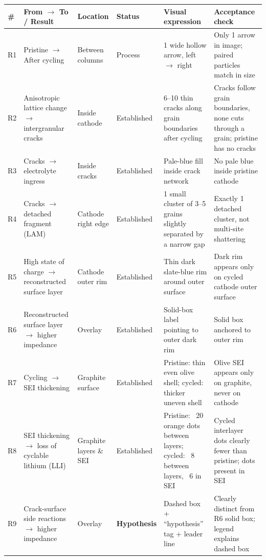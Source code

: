 \begin{center}\scriptsize
\setlength{\tabcolsep}{2.5pt}
\renewcommand{\arraystretch}{1.12}
\begin{tabularx}{\linewidth}{@{}l>{\raggedright\arraybackslash}p{24mm}>{\raggedright\arraybackslash}p{16mm}>{\raggedright\arraybackslash}p{16mm}YY@{}}
\toprule
\textbf{\#} & \textbf{From \ensuremath{\rightarrow} To / Result} & \textbf{Location} & \textbf{Status} & \textbf{Visual expression} & \textbf{Acceptance check} \\
\midrule
R1 & Pristine \ensuremath{\rightarrow} After cycling & Between columns & Process & 1 wide hollow arrow, left \ensuremath{\rightarrow} right & Only 1 arrow in image; paired particles match in size \\
R2 & Anisotropic lattice change \ensuremath{\rightarrow} intergranular cracks & Inside cathode & Established & 6--10 thin cracks along grain boundaries after cycling & Cracks follow grain boundaries, none cuts through a grain; pristine has no cracks \\
R3 & Cracks \ensuremath{\rightarrow} electrolyte ingress & Inside cracks & Established & Pale-blue fill inside crack network & No pale blue inside pristine cathode \\
R4 & Cracks \ensuremath{\rightarrow} detached fragment (LAM) & Cathode right edge & Established & 1 small cluster of 3--5 grains slightly separated by a narrow gap & Exactly 1 detached cluster, not multi-site shattering \\
R5 & High state of charge \ensuremath{\rightarrow} reconstructed surface layer & Cathode outer rim & Established & Thin dark slate-blue rim around outer surface & Dark rim appears only on cycled cathode outer surface \\
R6 & Reconstructed surface layer \ensuremath{\rightarrow} higher impedance & Overlay & Established & Solid-box label pointing to outer dark rim & Solid box anchored to outer rim \\
R7 & Cycling \ensuremath{\rightarrow} SEI thickening & Graphite surface & Established & Pristine: thin even olive shell; cycled: thicker uneven shell & Olive SEI appears only on graphite, never on cathode \\
R8 & SEI thickening \ensuremath{\rightarrow} loss of cyclable lithium (LLI) & Graphite layers \& SEI & Established & Pristine: ~20 orange dots between layers; cycled: ~8 between layers, ~6 in SEI & Cycled interlayer dots clearly fewer than pristine; dots present in SEI \\
R9 & Crack-surface side reactions \ensuremath{\rightarrow} higher impedance & Overlay & \textbf{Hypothesis} & Dashed box + ``hypothesis'' tag + leader line & Clearly distinct from R6 solid box; legend explains dashed box \\
\bottomrule
\end{tabularx}
\end{center}

